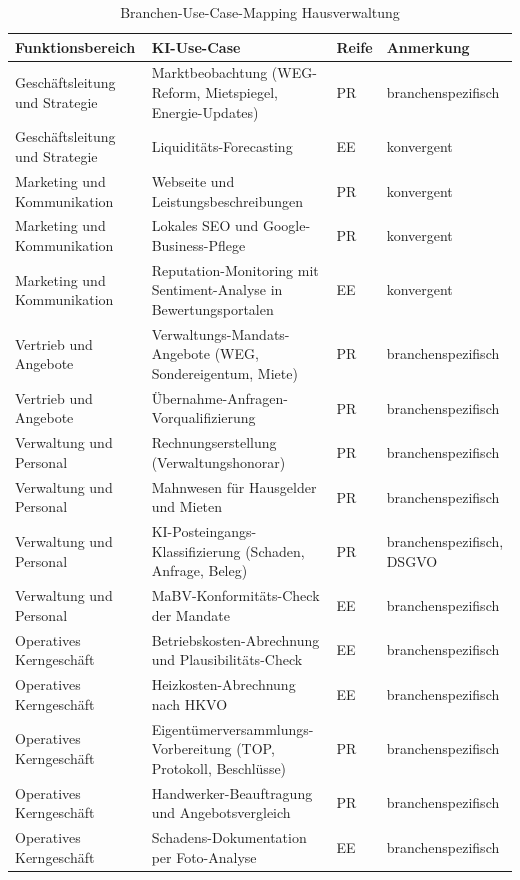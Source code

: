 \documentclass[a4paper,11pt]{article}
\begin{document}
\begin{table}[H]
\centering
\caption{Branchen-Use-Case-Mapping Hausverwaltung}
\label{tab:mapping-hausverwaltung}
\small
\begin{tabular}{p{3.3cm}p{7.3cm}p{1cm}p{2.5cm}}
\toprule
\textbf{Funktionsbereich} & \textbf{KI-Use-Case} & \textbf{Reife} & \textbf{Anmerkung} \\
\midrule
Geschäftsleitung und Strategie & Marktbeobachtung (WEG-Reform, Mietspiegel, Energie-Updates) & PR & branchenspezifisch \\
Geschäftsleitung und Strategie & Liquiditäts-Forecasting & EE & konvergent \\
Marketing und Kommunikation & Webseite und Leistungsbeschreibungen & PR & konvergent \\
Marketing und Kommunikation & Lokales SEO und Google-Business-Pflege & PR & konvergent \\
Marketing und Kommunikation & Reputation-Monitoring mit Sentiment-Analyse in Bewertungsportalen & EE & konvergent \\
Vertrieb und Angebote & Verwaltungs-Mandats-Angebote (WEG, Sondereigentum, Miete) & PR & branchenspezifisch \\
Vertrieb und Angebote & Übernahme-Anfragen-Vorqualifizierung & PR & branchenspezifisch \\
Verwaltung und Personal & Rechnungserstellung (Verwaltungshonorar) & PR & branchenspezifisch \\
Verwaltung und Personal & Mahnwesen für Hausgelder und Mieten & PR & branchenspezifisch \\
Verwaltung und Personal & KI-Posteingangs-Klassifizierung (Schaden, Anfrage, Beleg) & PR & branchenspezifisch, DSGVO \\
Verwaltung und Personal & MaBV-Konformitäts-Check der Mandate & EE & branchenspezifisch \\
Operatives Kerngeschäft & Betriebskosten-Abrechnung und Plausibilitäts-Check & EE & branchenspezifisch \\
Operatives Kerngeschäft & Heizkosten-Abrechnung nach HKVO & EE & branchenspezifisch \\
Operatives Kerngeschäft & Eigentümerversammlungs-Vorbereitung (TOP, Protokoll, Beschlüsse) & PR & branchenspezifisch \\
Operatives Kerngeschäft & Handwerker-Beauftragung und Angebotsvergleich & PR & branchenspezifisch \\
Operatives Kerngeschäft & Schadens-Dokumentation per Foto-Analyse & EE & branchenspezifisch \\

\end{tabular}
\end{table}
\end{document}
